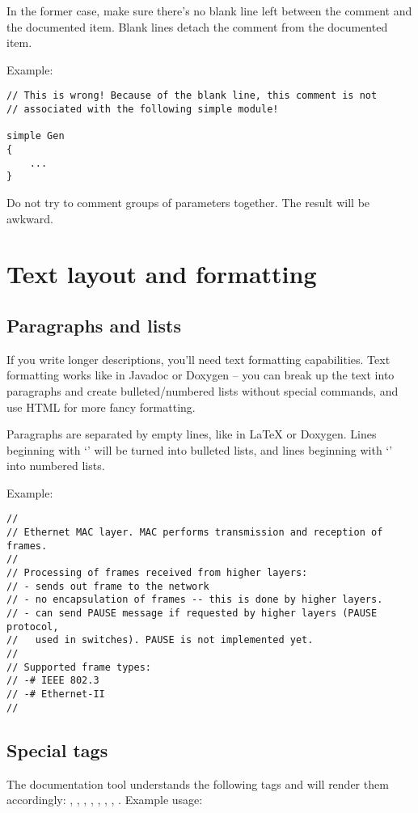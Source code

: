 In the former case, make sure there's no blank line left
between the comment and the documented item. Blank lines
detach the comment from the documented item.

Example:
\begin{verbatim}
// This is wrong! Because of the blank line, this comment is not
// associated with the following simple module!

simple Gen
{
    ...
}
\end{verbatim}

Do not try to comment groups of parameters together. The result
will be awkward.

\section{Text layout and formatting}

\subsection{Paragraphs and lists}

If you write longer descriptions, you'll need text formatting capabilities.
Text formatting works like in Javadoc or Doxygen -- you can break up the
text into paragraphs and create bulleted/numbered lists without
special commands, and use HTML for more fancy formatting.

Paragraphs are separated by empty lines, like in LaTeX or Doxygen.
Lines beginning with `\ttt{-}' will be turned into bulleted lists,
and lines beginning with `\ttt{-\#}' into numbered lists.

Example:

\begin{verbatim}
//
// Ethernet MAC layer. MAC performs transmission and reception of frames.
//
// Processing of frames received from higher layers:
// - sends out frame to the network
// - no encapsulation of frames -- this is done by higher layers.
// - can send PAUSE message if requested by higher layers (PAUSE protocol,
//   used in switches). PAUSE is not implemented yet.
//
// Supported frame types:
// -# IEEE 802.3
// -# Ethernet-II
//
\end{verbatim}


\subsection{Special tags}

The documentation tool understands the following tags and will render them accordingly:
, , , , , ,
, . Example usage:

